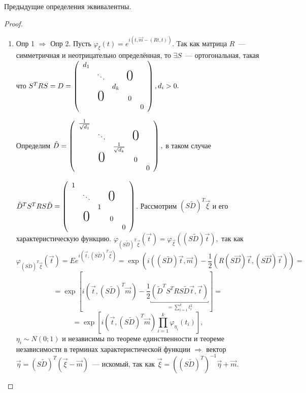 	\begin{theorem}
		Предыдущие определения эквивалентны.
	\end{theorem}
	\begin{proof}
		\begin{enumerate}
			\item Опр 1 \(\Rightarrow\) Опр 2. Пусть \(\varphi_\xi(t) = e^{i(t, \vec{m} - (Rt, t))}\). Так как матрица \(R\)~--- симметричная и неотрицательно определённая, то \(\exists S\)~---  ортогональная, такая что \(S^T RS = D = \left(
    \begin{array}{ccccc}
         d_1                              \\
                   &\ddots &  & \text{\huge0}\\
      &               & d_k               \\
      & \text{\huge0} &   & 0            \\
      &               &   &   & 0
    \end{array}
    \right), d_i > 0.\)

    Определим \(\tilde{D} = \left(
    \begin{array}{ccccc}
         \frac{1}{\sqrt{d_1}}                              \\
                   &\ddots &  & \text{\huge0}\\
      &               & \frac{1}{\sqrt{d_k}}               \\
      & \text{\huge0} &   & 0            \\
      &               &   &   & 0
    \end{array}
    \right),\) в таком случае 

    \(\tilde{D}^TS^TRS\tilde{D} = \left(
    \begin{array}{ccccc}
         1                              \\
                   &\ddots &  & \text{\huge0}\\
      &               & 1               \\
      & \text{\huge0} &   & 0            \\
      &               &   &   & 0
    \end{array}
    \right)\). Рассмотрим \((S\tilde{D})^T\vec{\xi}\) и его характеристическую функцию. \(\varphi_{(S\tilde{D})^T\vec{\xi}}(\vec{t}) = \varphi_{\vec{\xi}}((S\tilde{D})\vec{t}),\) так как
    \[
    	\varphi_{(S\tilde{D})^T\vec{\xi}}(\vec{t}) = Ee^{i(\vec{t}, (S\tilde{D})^T\vec{\xi})} = \exp(i((S\tilde{D})\vec{t}, \vec{m}) - \frac{1}{2}(R(S\vec{D})\vec{t}, (S\vec{D})\vec{t})) = 
    \]
    \[
    	=\exp[i(\vec{t}, (S\tilde{D})^T\vec{m}) - \frac{1}{2}\underbracket{(\tilde{D}^TS^TRS\tilde{D}\vec{t}, \vec{t})}_{=\sum\limits_{i = 1}^{k}t_i^2}] = 
    \]
    \[
    	= \exp[i(\vec{t}, (S\tilde{D})^T\vec{m})\prod\limits_{i = 1}^k \varphi_{\eta_i}(t_i)], 
    \]
    \(\eta_i \sim N(0;1)\) и независимы по теореме единственности и теореме независимости в терминах характеристической функции \(\Rightarrow\) вектор \(\vec{\eta} = (S\tilde{D})^T(\vec{\xi} - \vec{m})\)~--- искомый, так как \(\vec{\xi} = ((S\tilde{D})^T)^{-1}\vec{\eta}+\vec{m}.\)


\end{enumerate}
\end{proof}
